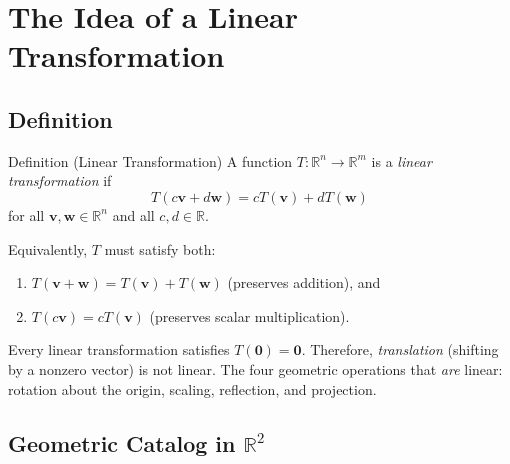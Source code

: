 
\section{The Idea of a Linear Transformation}

\subsection*{Definition}

\begin{propositionbox}{Definition (Linear Transformation)}
A function $T : \mathbb{R}^n \to \mathbb{R}^m$ is a \emph{linear transformation} if
\[
  T(c\mathbf{v} + d\mathbf{w}) = cT(\mathbf{v}) + dT(\mathbf{w})
\]
for all $\mathbf{v}, \mathbf{w} \in \mathbb{R}^n$ and all $c, d \in \mathbb{R}$.

Equivalently, $T$ must satisfy both:
\begin{enumerate}
  \item $T(\mathbf{v} + \mathbf{w}) = T(\mathbf{v}) + T(\mathbf{w})$ \quad (preserves addition), and
  \item $T(c\mathbf{v}) = cT(\mathbf{v})$ \quad (preserves scalar multiplication).
\end{enumerate}
\end{propositionbox}

\begin{remark*}
Every linear transformation satisfies $T(\mathbf{0}) = \mathbf{0}$.
Therefore, \emph{translation} (shifting by a nonzero vector) is not linear.
The four geometric operations that \emph{are} linear: rotation about the origin,
scaling, reflection, and projection.
\end{remark*}

\subsection*{\texorpdfstring{Geometric Catalog in $\mathbb{R}^2$}{Geometric Catalog in R2}}

